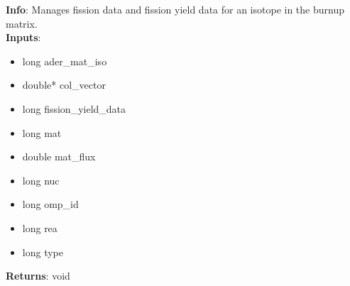 \textbf{Info}: Manages fission data and fission yield data for an isotope in
the burnup matrix.\\

\noindent \textbf{Inputs}:
\begin{itemize}
\item{long ader\_mat\_iso}
\item{double* col\_vector}
\item{long fission\_yield\_data}
\item{long mat}
\item{double mat\_flux}
\item{long nuc}
\item{long omp\_id}
\item{long rea}
\item{long type}
\end{itemize}

\noindent \textbf{Returns}: void
